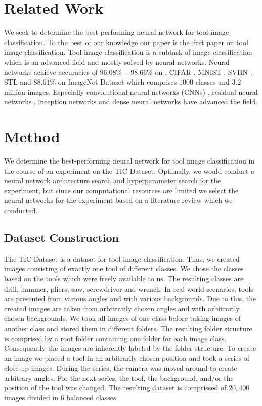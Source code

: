 \documentclass[a4paper, 10pt, journal]{wissarbIEEE}
\begin{document}
\section{Related Work}
\label{sec:relwork}
We seek to determine the best-performing neural network for tool image classification. To the best of our knowledge our paper is the first paper on tool image classification. Tool image classification is a subtask of image classification which is an advanced field and mostly solved by neural networks. Neural networks achieve accuracies of $96.08\%-98.66\%$\cite{Foret.2020, Kabir.2020} on , CIFAR \cite{cifar.2012}, MNIST \cite{mnist.2010}, SVHN \cite{svhn.2011}, STL\cite{stl.2011} and $88.61\%$\cite{Foret.2020} on ImageNet Dataset \cite{imagenet.2019} which comprises $1000$ classes and $3.2$ million images. Especially convolutional neural networks (CNNs) \cite{LeCun.2015b}, residual neural networks \cite{He.2016}, inception networks\cite{Szegedy.2015} and dense neural networks \cite{Huang.2017} have advanced the field.

\section{Method}
\label{sec:metho}
We determine the best-performing neural network for tool image classification in the course of an experiment on the TIC Dataset. Optimally, we would conduct a neural network architecture search and hyperparameter search for the experiment, but since our computational resources are limited we select the neural networks for the experiment based on a literature review which we conducted.

\subsection{Dataset Construction}
The TIC Dataset is a dataset for tool image classification. Thus, we created images consisting of exactly one tool of different classes. We chose the classes based on the tools which were freely available to us. The resulting classes are drill, hammer, pliers, saw, screwdriver and wrench.  In real world scenarios, tools are presented
from various angles and with various backgrounds. Due to this, the created images
are taken from arbitrarily chosen angles and with arbitrarily chosen backgrounds. We took all images of one class before taking images of another class and stored
them in different folders. The resulting folder structure is comprised by a root folder
containing one folder for each image class. Consequently the images are  inherently labeled by the folder structure. To  create an image we placed a tool in an arbitrarily chosen position and took a series of close-up images. During the series, the camera was moved around to create arbitrary angles. For the next series, the tool, the background,
and/or the position of the tool was changed. The resulting dataset is comprissed of $20,400$ images divided in $6$ balanced classes.
\end{document}
